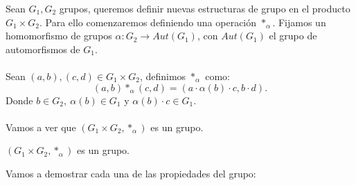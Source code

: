 Sean $G_1, G_2$ grupos, queremos definir nuevas estructuras de grupo en el producto $G_1 \times G_2$.
Para ello comenzaremos definiendo una operación $\ast_\alpha$. Fijamos un homomorfismo de grupos $\alpha:G_2 \longrightarrow Aut(G_1)$, con $Aut(G_1)$ el grupo de automorfismos de $G_1$.\\\\
Sean $(a,b),(c,d) \in G_1\times G_2$, definimos $\ast_\alpha$ como:
\[
	(a,b)\ast_\alpha(c,d) = (a\cdot\alpha(b)\cdot c, b\cdot d).
\]
Donde $b\in G_2,\ \alpha(b) \in G_1$ y $\alpha(b)\cdot c \in G_1$.\\\\
Vamos a ver que $(G_1 \times G_2, \ast_\alpha)$ es un grupo.
\begin{thm}
	$(G_1 \times G_2, \ast_\alpha)$ es un grupo.
\end{thm}
Vamos a demostrar cada una de las propiedades del grupo:
